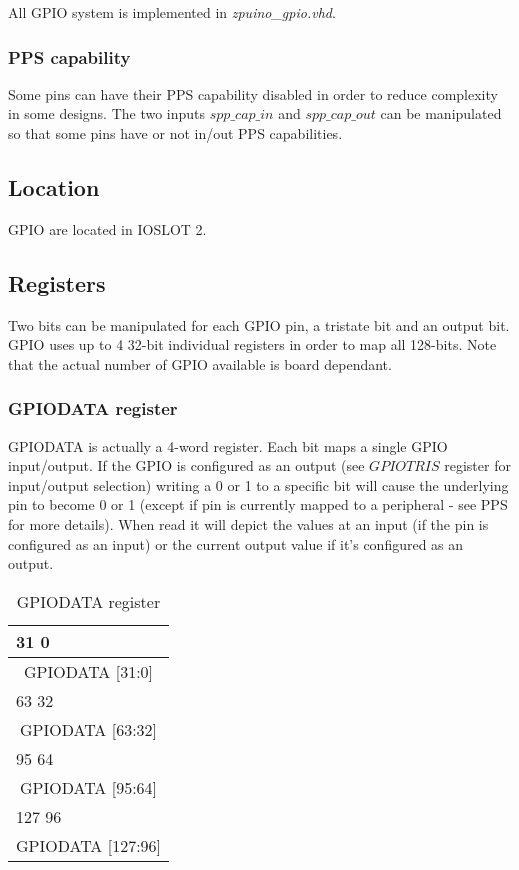 All GPIO system is implemented in \emph{zpuino\_gpio.vhd}.

\subsubsection{PPS capability}

Some pins can have their PPS capability disabled in order to reduce complexity in some designs. The two inputs $spp\_cap\_in$ and
$spp\_cap\_out$ can be manipulated so that some pins have or not in/out PPS capabilities.

\subsection{Location}
GPIO are located in IOSLOT 2.

\subsection{Registers}

Two bits can be manipulated for each GPIO pin, a tristate bit and an output bit. GPIO uses up to 4 32-bit individual
registers in order to map all 128-bits. Note that the actual number of GPIO available is board dependant.

\subsubsection{GPIODATA register}
GPIODATA is actually a 4-word register. Each bit maps a single GPIO input/output. If the GPIO is configured as an output (see 
$GPIOTRIS$ register for input/output selection) writing a 0 or 1 to a specific bit will cause the underlying pin to become 0 or 1 
(except if pin is currently mapped to a peripheral - see PPS for more details). When read it will depict the values at an input (if
the pin is configured as an input) or the current output value if it's configured as an output.
\begin{table}[H]
\begin{center}
\begin{tabularx}{14cm}{X}
31 \hfill 0 \\
\hline
\multicolumn{1}{|c|}{\tiny GPIODATA [31:0]} \\
\hline
63 \hfill 32 \\
\hline
\multicolumn{1}{|c|}{\tiny GPIODATA [63:32]} \\
\hline
95 \hfill 64 \\
\hline
\multicolumn{1}{|c|}{\tiny GPIODATA [95:64]} \\
\hline
127 \hfill 96 \\
\hline
\multicolumn{1}{|c|}{\tiny GPIODATA [127:96]} \\
\hline
\end{tabularx}
\caption{GPIODATA register}
\end{center}
\end{table}

